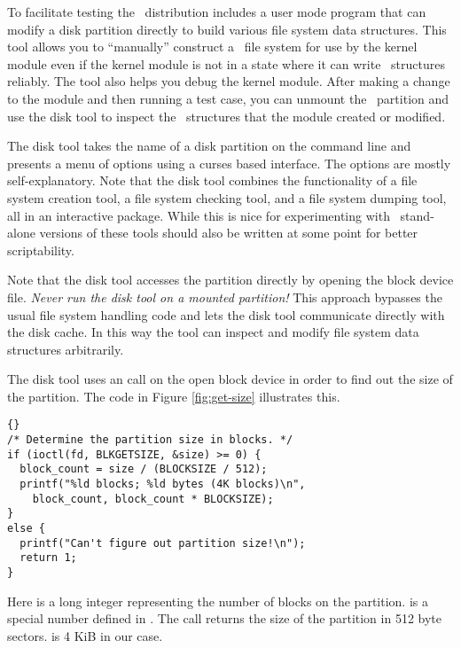 To facilitate testing the \GenericFS\ distribution includes a user mode program that can modify
a disk partition directly to build various file system data structures. This tool allows you to
``manually'' construct a \GenericFS\ file system for use by the kernel module even if the kernel
module is not in a state where it can write \GenericFS\ structures reliably. The tool also helps
you debug the kernel module. After making a change to the module and then running a test case,
you can unmount the \GenericFS\ partition and use the disk tool to inspect the \GenericFS\
structures that the module created or modified.

The disk tool takes the name of a disk partition on the command line and presents a menu of
options using a curses based interface. The options are mostly self-explanatory. Note that the
disk tool combines the functionality of a file system creation tool, a file system checking
tool, and a file system dumping tool, all in an interactive package. While this is nice for
experimenting with \GenericFS\ stand-alone versions of these tools should also be written at
some point for better scriptability.

Note that the disk tool accesses the partition directly by opening the block device file.
\emph{Never run the disk tool on a mounted partition!} This approach bypasses the usual file
system handling code and lets the disk tool communicate directly with the disk cache. In this
way the tool can inspect and modify file system data structures arbitrarily.

The disk tool uses an  call on the open block device in order to find out the size
of the partition. The code in Figure \ref{fig:get-size} illustrates this.

\begin{figure*}[tp]
  \centering
  \begin{wbigbox}
\begin{lstlisting}{}
/* Determine the partition size in blocks. */
if (ioctl(fd, BLKGETSIZE, &size) >= 0) {
  block_count = size / (BLOCKSIZE / 512);
  printf("%ld blocks; %ld bytes (4K blocks)\n",
    block_count, block_count * BLOCKSIZE);
}
else {
  printf("Can't figure out partition size!\n");
  return 1;
}
\end{lstlisting}
  \end{wbigbox}
  \caption{Getting Partition Size}
  \label{fig:get-size}
\end{figure*}

Here  is a long integer representing the number of blocks on the partition.
\code{BLKGETSIZE} is a special number defined in \code{<sys/ioctl.h>}. The \code{ioctl} call
returns the size of the partition in 512 byte sectors. \code{BLOCKSIZE} is 4 KiB in our case.

